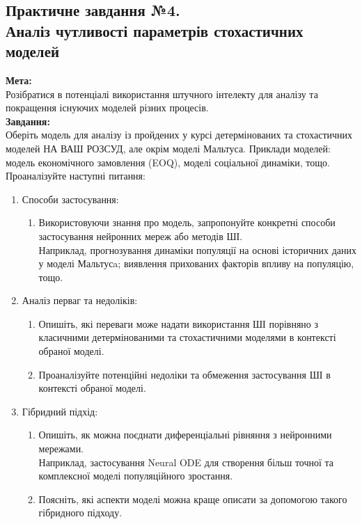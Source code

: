 \documentclass[a4paper,12pt]{article}
\begin{document}
\newpage
    \begin{center}
        \section*{\bfseries{Практичне завдання №4. \\
        Аналіз чутливості параметрів стохастичних моделей
        }}
    \end{center}
    \textbf{Мета:} \\
    Розібратися в потенціалі використання штучного інтелекту для аналізу та покращення існуючих моделей різних процесів. \\
    \textbf{Завдання:} \\
    Оберіть модель для аналізу із пройдених у курсі детермінованих та стохастичних моделей НА ВАШ РОЗСУД, але окрім моделі Мальтуса. Приклади моделей: модель економічного замовлення (EOQ), моделі соціальної динаміки, тощо.
    Проаналізуйте наступні питання:
    \begin{enumerate}
        \item Способи застосування:
        \begin{enumerate}
            \item Використовуючи знання про модель, запропонуйте конкретні способи застосування нейронних мереж або методів ШІ. \\
            Наприклад, прогнозування динаміки популяції на основі історичних даних у моделі Мальтусa; виявлення прихованих факторів впливу на популяцію, тощо.
        \end{enumerate}
        
        \item Аналіз перваг та недоліків:
        \begin{enumerate}
            \item Опишіть, які переваги може надати використання ШІ порівняно з класичними детермінованими та стохастичними моделями в контексті обраної моделі.
            \item Проаналізуйте потенційні недоліки та обмеження застосування ШІ в контексті обраної моделі.
        \end{enumerate}
        
        \item Гібридний підхід:
        \begin{enumerate}
            \item  Опишіть, як можна поєднати диференціальні рівняння з нейронними мережами. \\
            Наприклад, застосування Neural ODE для створення більш точної та комплексної моделі популяційного зростання.
            \item Поясніть, які аспекти моделі можна краще описати за допомогою такого гібридного підходу.
        \end{enumerate}
    \end{enumerate}
\end{document}
